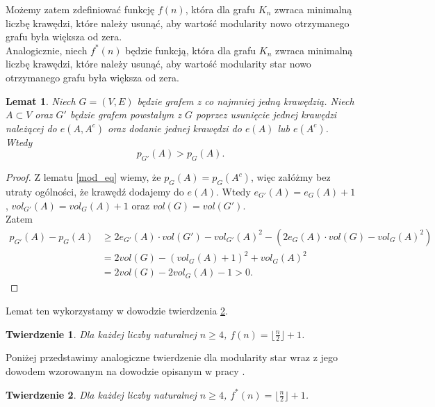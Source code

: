 \documentclass[letterpaper,12pt]{article}
\newtheorem{lemma}{Lemat}
\newtheorem{theorem}{Twierdzenie}
\begin{document}
Możemy zatem zdefiniować funkcję \textbf{\(f(n)\)}, która dla grafu \(K_n\) zwraca minimalną liczbę krawędzi, które należy usunąć, aby wartość modularity nowo otrzymanego grafu była większa od zera.\\

Analogicznie, niech \textbf{\(f^*(n)\)} będzie funkcją, która dla grafu \(K_n\) zwraca minimalną liczbę krawędzi, które należy usunąć, aby wartość modularity star nowo otrzymanego grafu była większa od zera.\\

\begin{lemma}
  \label{p_G'}
  Niech \(G = \left(V, E\right)\) będzie grafem z co najmniej jedną krawędzią. Niech \(A \subset V\) oraz \(G'\) będzie grafem powstałym z \(G\) poprzez usunięcie jednej krawędzi należącej do \(e(A, A^c)\) oraz dodanie jednej krawędzi do \(e(A)\) lub \(e(A^c)\). Wtedy
  \[p_{G'}(A) > p_G(A).\]
\end{lemma}
\begin{proof}
  Z lematu \ref{mod_eq} wiemy, że \(p_G(A) = p_G(A^c)\), więc załóżmy bez utraty ogólności, że krawędź dodajemy do \(e(A)\). Wtedy
  \(e_{G'}(A) = e_G(A)+1\), \(vol_{G'}(A) = vol_G(A) + 1\) oraz \(vol(G) = vol(G')\).\\
  Zatem
  \begin{align*}
    p_{G'}(A) - p_G(A) & \geq 2e_{G'}(A) \cdot vol(G') - vol_{G'}(A)^2 - \left(2e_{G}(A) \cdot vol(G) - vol_{G}(A)^2\right) \\
                       & = 2vol(G) - (vol_G(A)+1)^2 + vol_G(A)^2                                                            \\
                       & = 2vol(G) - 2vol_G(A) - 1 > 0.
  \end{align*}
\end{proof}
Lemat ten wykorzystamy w dowodzie twierdzenia \ref{f_star}.\\

\begin{theorem} %
  Dla każdej liczby naturalnej \(n \geq 4\), \(f(n) = \lfloor\frac{n}{2}\rfloor + 1\).
\end{theorem}

Poniżej przedstawimy analogiczne twierdzenie dla modularity star wraz z jego dowodem wzorowanym na dowodzie opisanym w pracy \cite{MS23}.\\

\begin{theorem}
  \label{f_star}
  Dla każdej liczby naturalnej \(n \geq 4\), \(f^*(n) = \lfloor\frac{n}{2}\rfloor + 1\).
\end{theorem}
\end{document}
